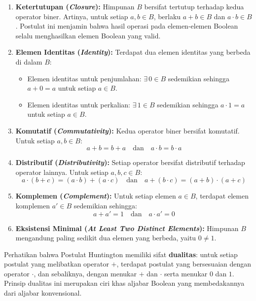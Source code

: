 \begin{enumerate}[label=\textbf{H\arabic*.}, itemsep=10pt]
  \item \textbf{Ketertutupan (\textit{Closure}):} Himpunan $B$ bersifat tertutup terhadap kedua operator biner. Artinya, untuk setiap $a, b \in B$, berlaku $a + b \in B$ dan $a \cdot b \in B$. Postulat ini menjamin bahwa hasil operasi pada elemen-elemen Boolean selalu menghasilkan elemen Boolean yang valid.

  \item \textbf{Elemen Identitas (\textit{Identity}):} Terdapat dua elemen identitas yang berbeda di dalam $B$:
  \begin{itemize}
      \item Elemen identitas untuk penjumlahan: $\exists\, 0 \in B$ sedemikian sehingga $a + 0 = a$ untuk setiap $a \in B$.
      \item Elemen identitas untuk perkalian: $\exists\, 1 \in B$ sedemikian sehingga $a \cdot 1 = a$ untuk setiap $a \in B$.
  \end{itemize}

  \item \textbf{Komutatif (\textit{Commutativity}):} Kedua operator biner bersifat komutatif. Untuk setiap $a, b \in B$:
  \[ a + b = b + a \quad \text{dan} \quad a \cdot b = b \cdot a \]

  \item \textbf{Distributif (\textit{Distributivity}):} Setiap operator bersifat distributif terhadap operator lainnya. Untuk setiap $a, b, c \in B$:
  \[ a \cdot (b + c) = (a \cdot b) + (a \cdot c) \quad \text{dan} \quad a + (b \cdot c) = (a + b) \cdot (a + c) \]

  \item \textbf{Komplemen (\textit{Complement}):} Untuk setiap elemen $a \in B$, terdapat elemen komplemen $a' \in B$ sedemikian sehingga:
  \[ a + a' = 1 \quad \text{dan} \quad a \cdot a' = 0 \]

  \item \textbf{Eksistensi Minimal (\textit{At Least Two Distinct Elements}):} Himpunan $B$ mengandung paling sedikit dua elemen yang berbeda, yaitu $0 \neq 1$.
\end{enumerate}

\begin{konsep}
Perhatikan bahwa Postulat Huntington memiliki sifat \textbf{dualitas}: untuk setiap postulat yang melibatkan operator $+$, terdapat postulat yang bersesuaian dengan operator $\cdot$, dan sebaliknya, dengan menukar $+$ dan $\cdot$ serta menukar $0$ dan $1$. Prinsip dualitas ini merupakan ciri khas aljabar Boolean yang membedakannya dari aljabar konvensional.
\end{konsep}

